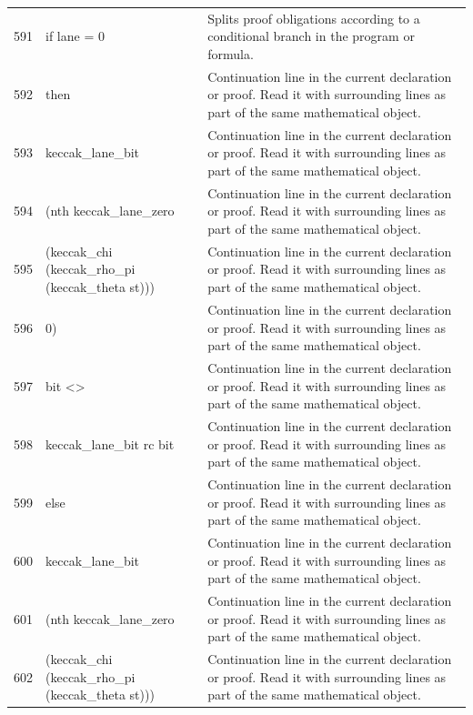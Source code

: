 \documentclass[10pt]{article}
\begin{document}
\begin{longtable}{r L{0.53\textwidth} L{0.37\textwidth}}
591 & {\ttfamily\scriptsize   if lane = 0} & Splits proof obligations according to a conditional branch in the program or formula. \\
592 & {\ttfamily\scriptsize   then} & Continuation line in the current declaration or proof.  Read it with surrounding lines as part of the same mathematical object. \\
593 & {\ttfamily\scriptsize     keccak\_lane\_bit} & Continuation line in the current declaration or proof.  Read it with surrounding lines as part of the same mathematical object. \\
594 & {\ttfamily\scriptsize       (nth keccak\_lane\_zero} & Continuation line in the current declaration or proof.  Read it with surrounding lines as part of the same mathematical object. \\
595 & {\ttfamily\scriptsize         (keccak\_chi (keccak\_rho\_pi (keccak\_theta st)))} & Continuation line in the current declaration or proof.  Read it with surrounding lines as part of the same mathematical object. \\
596 & {\ttfamily\scriptsize         0)} & Continuation line in the current declaration or proof.  Read it with surrounding lines as part of the same mathematical object. \\
597 & {\ttfamily\scriptsize       bit <>} & Continuation line in the current declaration or proof.  Read it with surrounding lines as part of the same mathematical object. \\
598 & {\ttfamily\scriptsize     keccak\_lane\_bit rc bit} & Continuation line in the current declaration or proof.  Read it with surrounding lines as part of the same mathematical object. \\
599 & {\ttfamily\scriptsize   else} & Continuation line in the current declaration or proof.  Read it with surrounding lines as part of the same mathematical object. \\
600 & {\ttfamily\scriptsize     keccak\_lane\_bit} & Continuation line in the current declaration or proof.  Read it with surrounding lines as part of the same mathematical object. \\
601 & {\ttfamily\scriptsize       (nth keccak\_lane\_zero} & Continuation line in the current declaration or proof.  Read it with surrounding lines as part of the same mathematical object. \\
602 & {\ttfamily\scriptsize         (keccak\_chi (keccak\_rho\_pi (keccak\_theta st)))} & Continuation line in the current declaration or proof.  Read it with surrounding lines as part of the same mathematical object. \\

\end{longtable}
\end{document}
